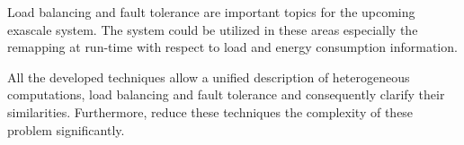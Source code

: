 Load balancing and fault tolerance are important topics
for the upcoming exascale system. The system could be utilized in
these areas especially the remapping at run-time with respect to
load and energy consumption information.

All the developed techniques allow a unified description of
heterogeneous computations, load balancing and fault tolerance
and consequently clarify their similarities. Furthermore, reduce
these techniques the complexity of these problem significantly.


  

\cleardoublepage

